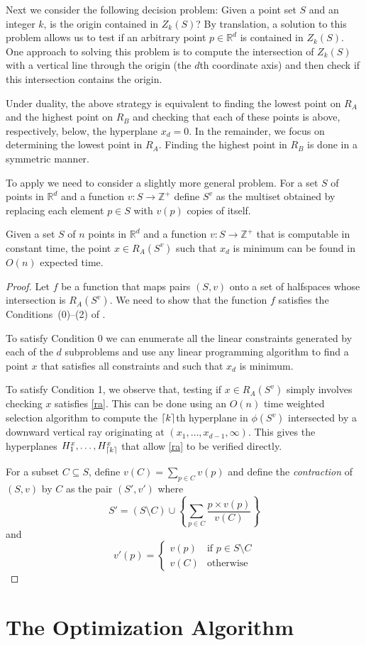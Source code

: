\documentclass[lotsofwhite]{patmorin}
\begin{document}
Next we consider the following decision problem:  Given a point set
$S$ and an integer $k$, is the origin contained in $Z_k(S)$?  By
translation, a solution to this problem allows us to test if an
arbitrary point $p\in\mathbb{R}^d$ is contained in $Z_k(S)$. One
approach to solving this problem is to compute the intersection of
$Z_k(S)$ with a vertical line through the origin (the $d$th coordinate
axis) and then check if this intersection contains the origin. 

Under duality, the above strategy is equivalent to finding the lowest
point on $R_A$ and the highest point on $R_B$ and checking that each
of these points is above, respectively, below, the hyperplane $x_d=0$.
In the remainder, we focus on determining the lowest point in $R_A$.
Finding the highest point in $R_B$ is done in a symmetric manner.  

To apply  we need to consider a slightly more general
problem.  For a set $S$ of points in $\mathbb{R}^d$ and a function
$v:S\rightarrow\mathbb{Z}^+$ define $S^v$ as the multiset obtained by
replacing each element $p\in S$ with $v(p)$ copies of itself. 

\begin{lem}
Given a set $S$ of $n$ points in $\mathbb{R}^d$ and a 
function $v:S\rightarrow\mathbb{Z}^+$ that is computable in constant
time, the point $x\in R_A(S^v)$ such
that $x_d$ is minimum can be found in $O(n)$ expected
time.
\end{lem}

\begin{proof}
Let $f$ be a function that maps pairs $(S,v)$ onto a set of
halfspaces whose intersection is $R_A(S^v)$.  We need to show that the
function $f$ satisfies the Conditions~(0)--(2) of .

To satisfy Condition 0 we can enumerate all the linear constraints
generated by each of the $d$ subproblems and use any linear
programming algorithm to find a point $x$ that satisfies all
constraints and such that $x_d$ is minimum.

To satisfy Condition 1, we observe that, testing if $x\in R_A(S^v)$
simply involves checking $x$ satisfies \eqref{ra}.  This can be done
using an $O(n)$ time weighted selection algorithm to compute the
$\left\lceil k \right\rceil$th hyperplane in $\phi(S^v)$ intersected by a downward
vertical ray originating at $(x_1,\ldots,x_{d-1},\infty)$.  This gives
the hyperplanes $H_1^x,\ldots,H_{\left\lceil k \right\rceil}^x$ that allow \eqref{ra} to
be verified directly.

For a
subset $C\subseteq S$, define $v(C)=\sum_{p\in C}v(p)$ and define the
\emph{contraction} of $(S,v)$ by $C$ as the pair $(S',v')$ where
\[
    S' = (S\setminus C)
	\cup \left\{\sum_{p\in C} \frac{p\times v(p)}{v(C)}\right\}
\]
and 
\[
    v'(p) = \left\{\begin{array}{ll}
                   v(p) & \mbox{if $p\in S\setminus C$} \\
                   v(C) & \mbox{otherwise} 
    \end{array}\right.
\]
\end{proof}


\section{The Optimization Algorithm}
\end{document}
